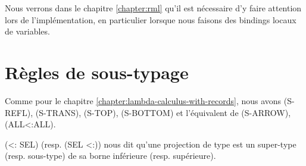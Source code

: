 Nous verrons dans le chapitre \ref{chapter:rml} qu'il est nécessaire d'y faire
attention lors de l'implémentation, en particulier lorsque nous faisons des
bindings locaux de variables.

\section{Règles de sous-typage}


Comme pour le chapitre \ref{chapter:lambda-calculus-with-records}, nous
avons (S-REFL), (S-TRANS), (S-TOP), (S-BOTTOM) et l'équivalent de (S-ARROW), (ALL<:ALL).

(<: SEL) (resp. (SEL <:)) nous dit qu'une projection de type est un super-type (resp.
sous-type) de sa borne inférieure (resp. supérieure).

